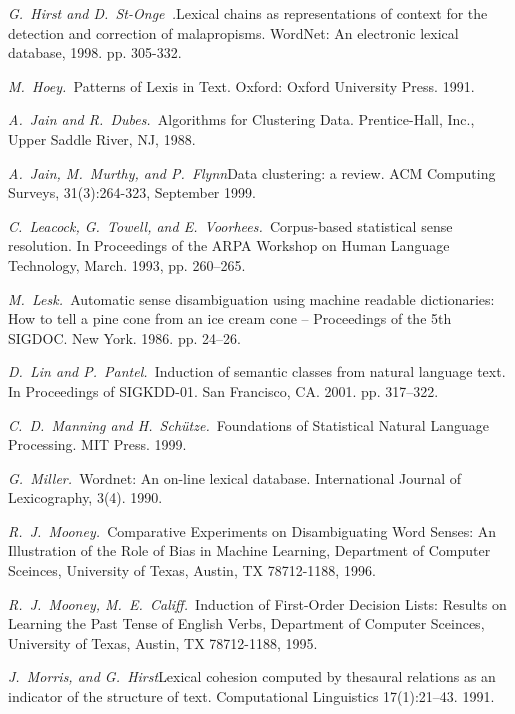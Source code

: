 \documentclass{article}
\begin{document}
\begin{articletext}
\begin{thebibliography}{9}
\textit{G.~Hirst and D.~St-Onge~.}Lexical chains as representations of context for the detection and correction of malapropisms. WordNet: An electronic lexical database, 1998. pp. 305-332.

\textit{M.~Hoey.~}Patterns of Lexis in Text. Oxford: Oxford University Press. 1991. 

\textit{A.~Jain and R.~Dubes.~}Algorithms for Clustering Data. Prentice-Hall, Inc., Upper Saddle River, NJ, 1988.

\textit{A.~Jain, M.~Murthy, and P.~Flynn}Data clustering: a review. ACM Computing Surveys, 31(3):264-323, September 1999.

\textit{C.~Leacock, G.~Towell, and E.~Voorhees.~}Corpus-based statistical sense resolution. In Proceedings of the ARPA Workshop on Human Language Technology, March. 1993, pp. 260–265.  

\textit{M.~Lesk.~}Automatic sense disambiguation using machine readable dictionaries: How to tell a pine cone from an ice cream cone --  Proceedings  of  the 5th SIGDOC. New York. 1986. pp. 24–26. 

\textit{D.~Lin and P.~Pantel.~}Induction of semantic classes from natural language text. In Proceedings of SIGKDD-01. San Francisco, CA. 2001. pp. 317–322.   

\textit{C.~D.~Manning and H.~Sch\"utze.~}Foundations of Statistical Natural Language Processing. MIT Press. 1999.

\textit{G.~Miller.~}Wordnet: An on-line lexical database. International Journal of Lexicography, 3(4). 1990.

\textit{R.~J.~Mooney.~}Comparative Experiments on Disambiguating Word Senses:
An Illustration of the Role of Bias in Machine Learning, Department of Computer Sceinces, University of Texas, Austin, TX 78712-1188, 1996.

\textit{R.~J.~Mooney, M.~E.~Califf.~}Induction of First-Order Decision Lists: Results on Learning the Past Tense of English Verbs, Department of Computer Sceinces, University of Texas, Austin, TX 78712-1188, 1995.

\textit{J.~Morris, and G.~Hirst}Lexical cohesion computed by thesaural relations as an indicator of the structure of text. Computational Linguistics 17(1):21–43. 1991. 


\end{thebibliography}
\end{articletext}
\end{document}
